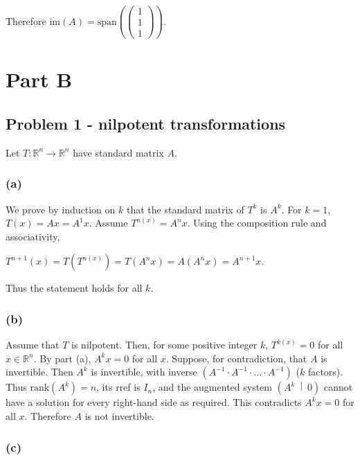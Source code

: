 Therefore \(\text{im}(A) = \text{span}\left( \begin{pmatrix}
1 \\
1 \\
1
\end{pmatrix} \right)\).

\section{Part B}

\subsection{Problem 1 - nilpotent transformations}

Let \(T:\mathbb{R}^{n}\rightarrow\mathbb{R}^{n}\) have standard matrix \(A\).

\subsubsection{(a)}

We prove by induction on \(k\) that the standard matrix of \(T^{k}\) is \(A^{k}\). For \(k = 1\), \(T(x) = Ax = A^{1}x\). Assume \(T^{n{(x)}} = A^{n}x\). Using the composition rule and associativity,

\(T^{n + 1}(x) = T\left( T^{n{(x)}} \right) = T\left( {A^{n}x} \right) = A\left( {A^{n}x} \right) = A^{n + 1}x.\)

Thus the statement holds for all \(k\).

\subsubsection{(b)}

Assume that \(T\) is nilpotent. Then, for some positive integer \(k\), \(T^{k{(x)}} = 0\) for all \(x \in \mathbb{R}^{n}\). By part (a), \(A^{k}x = 0\) for all \(x\). Suppose, for contradiction, that \(A\) is invertible. Then \(A^{k}\) is invertible, with inverse \(\left( {A^{- 1} \cdot A^{- 1} \cdot \ldots \cdot A^{- 1}} \right)\) (\(k\) factors). Thus \(\text{rank}\left( A^{k} \right) = n\), its rref is \(I_{n}\), and the augmented system \(\left( A^{k}\  \middle| \ 0 \right)\) cannot have a solution for every right-hand side as required. This contradicts \(A^{k}x = 0\) for all \(x\). Therefore \(A\) is not invertible.

\subsubsection{(c)}

